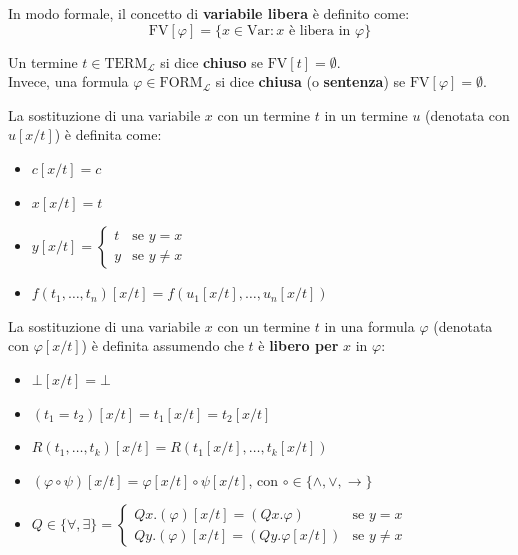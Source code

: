 \documentclass[a4paper, 12pt]{book}
\newcommand{\definizione}[2]{%
\vspace{15pt}%
\begin{tcolorbox}[
  colback=cyan!5!white,
  colframe=blue!50!black,
  title=\textbf{Definizione: #1}, %
  coltitle=white,
  fonttitle=\bfseries,
  arc=3mm,
  boxrule=0.5pt,
  enhanced,
  breakable
]
#2 %
\end{tcolorbox}
\vspace{15pt}%
}
\begin{document}
In modo formale, il concetto di \textbf{variabile libera} è definito come:
\begin{equation*}
  \text{FV}[\varphi] = \{x \in \text{Var} : x \text{ è libera in } \varphi\}
\end{equation*}

Un termine $t \in \text{TERM}_\mathcal{L}$ si dice \textbf{chiuso} se $\text{FV}[t] = \emptyset$. \\[0.2ex]
Invece, una formula $\varphi \in \text{FORM}_\mathcal{L}$ si dice \textbf{chiusa} (o \textbf{sentenza}) se $\text{FV}[\varphi] = \emptyset$.

\definizione{sostituzione di una variabile (ricorsiva)}{La sostituzione di una variabile $x$ con un termine $t$ in un termine $u$ (denotata con $u[x/t]$) è definita come:
\begin{itemize}
  \item $c[x/t] = c$
  \item $x[x/t] = t$
  \item $y[x/t] = \begin{cases}
    t & \text{se } y = x \\
    y & \text{se } y \neq x
  \end{cases}$
  \item $f(t_1, \dots, t_n)[x/t] = f(u_1[x/t], \dots, u_n[x/t])$
\end{itemize}}

\definizione{sostituzione di una variabile (induttiva)}{La sostituzione di una variabile $x$ con un termine $t$ in una formula $\varphi$ (denotata con $\varphi[x/t]$) è definita assumendo che $t$ è \textbf{libero per} $x$ in $\varphi$:
\begin{itemize}
  \item $\bot[x/t] = \bot$
  \item $(t_1 = t_2)[x/t] = t_1[x/t] = t_2[x/t]$
  \item $R(t_1, \dots, t_k)[x/t] = R(t_1[x/t], \dots, t_k[x/t])$
  \item $(\varphi \circ \psi)[x/t] = \varphi[x/t] \circ \psi[x/t]$, con $\circ \in \{\land, \lor, \rightarrow\}$
  \item $Q \in \{\forall, \exists\} = \begin{cases}
    Qx.(\varphi)[x/t] = (Qx.\varphi) & \text{se } y = x \\
    Qy.(\varphi)[x/t] = (Qy.\varphi[x/t]) & \text{se } y \neq x
  \end{cases}$
\end{itemize}}
\end{document}
